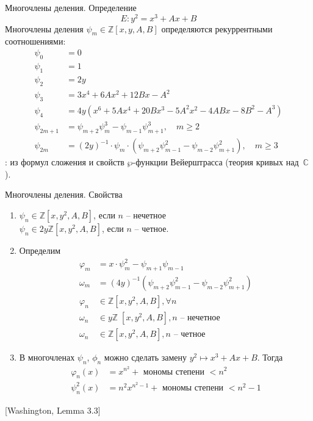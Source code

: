 \documentclass{beamer}
\begin{document}
\begin{frame}{Многочлены деления. Определение}
\[E: y^2 = x^3 + A x + B \]
Многочлены деления ${\psi _m} \in \mathbb{Z}[ {x,y,A,B}]$ определяются рекуррентными соотношениями:
\begin{align*}
    {\psi _0} &= 0 \\
    {\psi _1} &= 1 \\
    {\psi _2} &= 2y \\
    {\psi _3} &= 3{x^4} + 6A{x^2} + 12Bx - {A^2} \\
    {\psi _4} &= 4{y}\left( {{x^6} + 5A{x^4} + 20B{x^3} - 5{A^2}{x^2} - 4ABx - 8{B^2} - {A^3}} \right) \\
    {\psi _{2m + 1}} &= {\psi _{m + 2}}\psi _m^3 - {\psi _{m - 1}}\psi _{m + 1}^3, \quad m \geqslant 2 \\
    {\psi _{2m}} &= {\left( {2y} \right)^{ - 1}} \cdot {\psi _m} \cdot \left( {{\psi _{m + 2}}\psi _{m - 1}^2 - {\psi _{m - 2}}\psi _{m + 1}^2} \right),\quad m \geqslant 3
\end{align*}
: из формул сложения и свойств $\wp$-функции Вейерштрасса (теория кривых над~$\mathbb{C}$).
\end{frame}



\begin{frame}{Многочлены деления. Свойства}
\begin{enumerate}
    \item 
    ${\psi _n} \in \mathbb{Z}[x, y^2, A, B]$, если $n$ -- нечетное \\
    ${\psi _n} \in 2y\mathbb{Z}[x, y^2, A, B]$, если $n$ -- четное. 
    \item Определим
    \begin{align*}
        {\varphi _m} &= x \cdot \psi _m^2 - {\psi _{m + 1}}{\psi _{m - 1}} \\
        {\omega _m} &= {\left( {4y} \right)^{ - 1}}\left( {{\psi _{m + 2}}\psi _{m - 1}^2 - {\psi _{m - 2}}\psi _{m + 1}^2} \right) \\
        {\varphi _n} &\in \mathbb{Z}\left[ {x, {y^2},A,B} \right], \forall n \\
        {\omega _n} &\in y\mathbb{Z}\;\left[ {x, {y^2},A,B} \right], n{\text{  --  нечетное}} \\
        {\omega _n} &\in \mathbb{Z}\left[ {x, {y^2},A,B} \right],n{\text{ -- четное}}
    \end{align*}
    
    
    \item В многочленах ${\psi _n}$, ${\phi _n}$ можно сделать замену ${y^2} \mapsto {x^3} + Ax + B$. %
    Тогда 
    \begin{align*}
        {\varphi _n}\left( x \right) &= {x^{{n^2}}} + {\text{ мономы степени }} < {n^2} \\
        \psi _n^2\left( x \right) &= {n^2}{x^{{n^2} - 1}} + {\text{ мономы степени }} < {n^2} - 1
    \end{align*}
\end{enumerate}
\ProofBegin {} [Washington, Lemma 3.3] \ProofEnd
\end{frame}
\end{document}
